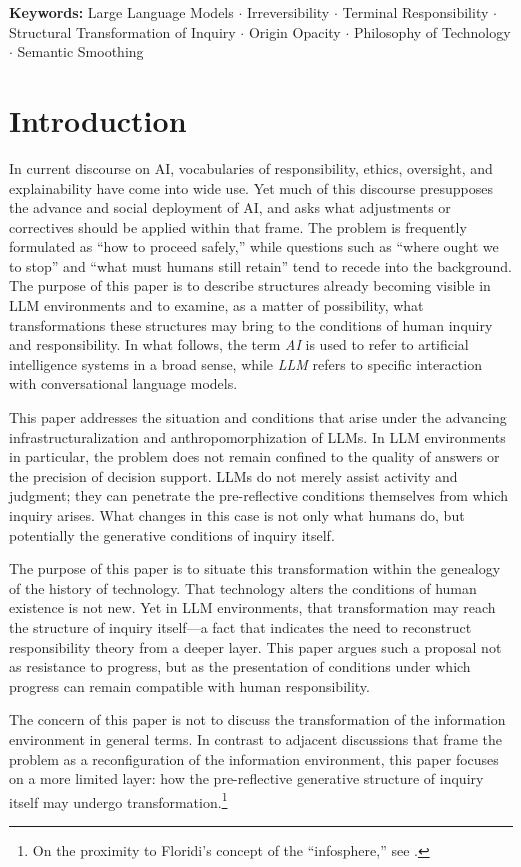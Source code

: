 \documentclass[12pt]{article}
\begin{document}
\noindent\textbf{Keywords:} Large Language Models $\cdot$ Irreversibility $\cdot$ Terminal Responsibility $\cdot$ Structural Transformation of Inquiry $\cdot$ Origin Opacity $\cdot$ Philosophy of Technology $\cdot$ Semantic Smoothing

\section{Introduction}

In current discourse on AI, vocabularies of responsibility, ethics, oversight, and explainability have come into wide use. Yet much of this discourse presupposes the advance and social deployment of AI, and asks what adjustments or correctives should be applied within that frame. The problem is frequently formulated as ``how to proceed safely,'' while questions such as ``where ought we to stop'' and ``what must humans still retain'' tend to recede into the background. The purpose of this paper is to describe structures already becoming visible in LLM environments and to examine, as a matter of possibility, what transformations these structures may bring to the conditions of human inquiry and responsibility. In what follows, the term \textit{AI} is used to refer to artificial intelligence systems in a broad sense, while \textit{LLM} refers to specific interaction with conversational language models.

This paper addresses the situation and conditions that arise under the advancing infrastructuralization and anthropomorphization of LLMs. In LLM environments in particular, the problem does not remain confined to the quality of answers or the precision of decision support. LLMs do not merely assist activity and judgment; they can penetrate the pre-reflective conditions themselves from which inquiry arises. What changes in this case is not only what humans do, but potentially the generative conditions of inquiry itself.

The purpose of this paper is to situate this transformation within the genealogy of the history of technology. That technology alters the conditions of human existence is not new. Yet in LLM environments, that transformation may reach the structure of inquiry itself---a fact that indicates the need to reconstruct responsibility theory from a deeper layer. This paper argues such a proposal not as resistance to progress, but as the presentation of conditions under which progress can remain compatible with human responsibility.

The concern of this paper is not to discuss the transformation of the information environment in general terms. In contrast to adjacent discussions that frame the problem as a reconfiguration of the information environment, this paper focuses on a more limited layer: how the pre-reflective generative structure of inquiry itself may undergo transformation.\footnote{On the proximity to Floridi's concept of the ``infosphere,'' see \citet{floridi2014}.}
\end{document}
